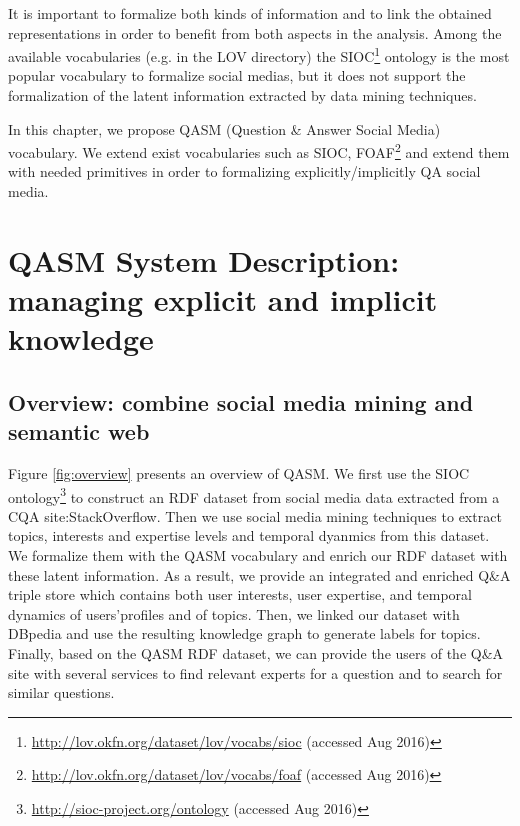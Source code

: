It is important to formalize both kinds of information and to link the obtained representations in order to benefit from both aspects in the analysis. Among the available vocabularies (e.g. in the LOV directory) the SIOC\footnote{\url{http://lov.okfn.org/dataset/lov/vocabs/sioc} (accessed Aug 2016)} %
ontology is the most popular vocabulary to formalize social medias, but it does not support the formalization of the latent information extracted by data mining techniques.


In this chapter, we propose QASM (Question \& Answer Social Media) vocabulary. We extend exist vocabularies such as SIOC, FOAF\footnote{\url{http://lov.okfn.org/dataset/lov/vocabs/foaf} (accessed Aug 2016)} and extend them with needed primitives in order to formalizing explicitly/implicitly QA social media.


\section{QASM System Description: managing explicit and implicit knowledge}
\subsection{Overview: combine social media mining and semantic web}
Figure \ref{fig:overview} presents an overview of QASM. We first use the SIOC ontology\footnote{\url{http://sioc-project.org/ontology} (accessed Aug 2016)} to construct an RDF dataset from social media data extracted from a CQA site:StackOverflow. Then we use social media mining techniques to extract topics, interests and expertise levels and temporal dyanmics from this dataset. We formalize them with the QASM vocabulary and enrich our RDF dataset with these latent information. As a result, we provide an integrated and enriched Q\&A triple store which contains both user interests, user expertise, and temporal dynamics of users'profiles and of topics. Then, we linked our dataset with DBpedia and use the resulting knowledge graph to generate labels for topics. Finally, based on the QASM RDF dataset, we can provide the users of the Q\&A site with several services to find relevant experts for a question and to search for similar questions.

